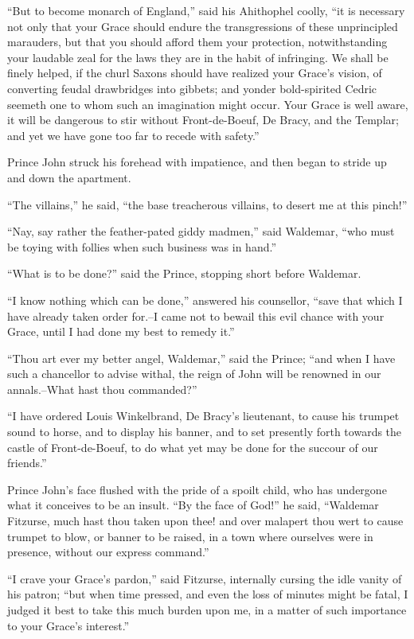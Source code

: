 ``But to become monarch of England,'' said his Ahithophel coolly, ``it
is necessary not only that your Grace should endure the transgressions
of these unprincipled marauders, but that you should afford them your
protection, notwithstanding your laudable zeal for the laws they are in
the habit of infringing. We shall be finely helped, if the churl Saxons
should have realized your Grace's vision, of converting feudal
drawbridges into gibbets; and yonder bold-spirited Cedric seemeth one to
whom such an imagination might occur. Your Grace is well aware, it will
be dangerous to stir without Front-de-Boeuf, De Bracy, and the Templar;
and yet we have gone too far to recede with safety.''

Prince John struck his forehead with impatience, and then began to
stride up and down the apartment.

``The villains,'' he said, ``the base treacherous villains, to desert me
at this pinch!''

``Nay, say rather the feather-pated giddy madmen,'' said Waldemar, ``who
must be toying with follies when such business was in hand.''

``What is to be done?'' said the Prince, stopping short before Waldemar.

``I know nothing which can be done,'' answered his counsellor, ``save
that which I have already taken order for.--I came not to bewail this
evil chance with your Grace, until I had done my best to remedy it.''

``Thou art ever my better angel, Waldemar,'' said the Prince; ``and when
I have such a chancellor to advise withal, the reign of John will be
renowned in our annals.--What hast thou commanded?''

``I have ordered Louis Winkelbrand, De Bracy's lieutenant, to cause his
trumpet sound to horse, and to display his banner, and to set presently
forth towards the castle of Front-de-Boeuf, to do what yet may be done
for the succour of our friends.''

Prince John's face flushed with the pride of a spoilt child, who has
undergone what it conceives to be an insult. ``By the face of God!'' he
said, ``Waldemar Fitzurse, much hast thou taken upon thee! and over
malapert thou wert to cause trumpet to blow, or banner to be raised, in
a town where ourselves were in presence, without our express command.''

``I crave your Grace's pardon,'' said Fitzurse, internally cursing the
idle vanity of his patron; ``but when time pressed, and even the loss of
minutes might be fatal, I judged it best to take this much burden upon
me, in a matter of such importance to your Grace's interest.''

